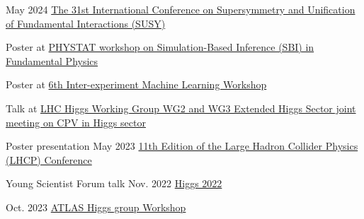
\begin{cventries}
    {}
    {May 2024}
    {\href{https://indico.cern.ch/event/1354279/contributions/5942297/}{The 31st International Conference on Supersymmetry and Unification of Fundamental Interactions (SUSY)}}
    {}\vspace*{2mm}

    {}
    {}
    {}
    {
        \begin{cvitems}
        \item Poster at \href{https://indico.cern.ch/event/1355601/contributions/5910202/}{PHYSTAT workshop on Simulation-Based Inference (SBI) in Fundamental Physics}
        \item Poster at \href{https://indico.cern.ch/event/1297159/contributions/5729232/}{6th Inter-experiment Machine Learning Workshop}
        \item Talk at \href{https://indico.cern.ch/event/1230456/\#5-simulation-based-inference-i}{LHC Higgs Working Group WG2 and WG3 Extended Higgs Sector joint meeting on CPV in Higgs sector}
        \end{cvitems}
    }\vspace*{2mm}
    
    {Poster presentation}
    {May 2023}
    {\href{https://indico.cern.ch/event/1198609/contributions/5340462/}{11th Edition of the Large Hadron Collider Physics (LHCP) Conference}}
    {}\vspace*{2mm}
    
    {Young Scientist Forum talk}
    {Nov. 2022}
    {\href{https://indico.cern.ch/event/1086716/contributions/5049260/}{Higgs 2022}}
    {}\vspace*{2mm}


    {}
    {Oct. 2023}
    {\href{https://indico.cern.ch/event/1280531/contributions/5556190/}{ATLAS Higgs group Workshop}}{}\vspace*{2mm}



\end{cventries}
